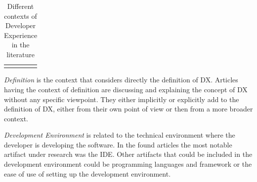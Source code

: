\documentclass[english, 12pt, a4paper, sci, utf8, a-1b, online]{aaltothesis}
\begin{document}
{\begin{center}
\begin{longtable}{p{0.3\linewidth}p{0.6\linewidth}}
      \caption{Different contexts of Developer Experience in the literature}                                                                                                                                                                                                                                                                                                                                                                                                                                                                                                                                                                                                                                                                                                                                                                                                              \\
      \label{table:context}                                                                                                                                                                                                                                                                                                                                                                                                                                                                                                                                                                                                                                                                                                                                                                                                                                                               \\
    \end{longtable}
  \end{center}
  \renewcommand{\arraystretch}{1}
}


\textit{Definition} is the context that considers directly the definition of DX. Articles having the context of definition are discussing and explaining the concept of DX without any specific viewpoint. They either implicitly or explicitly add to the definition of DX, either from their own point of view or then from a more broader context.

\textit{Development Environment} is related to the technical environment where the developer is developing the software. In the found articles the most notable artifact under research was the IDE. Other artifacts that could be included in the development environment could be programming languages and framework or the ease of use of setting up the development environment.
\end{document}
